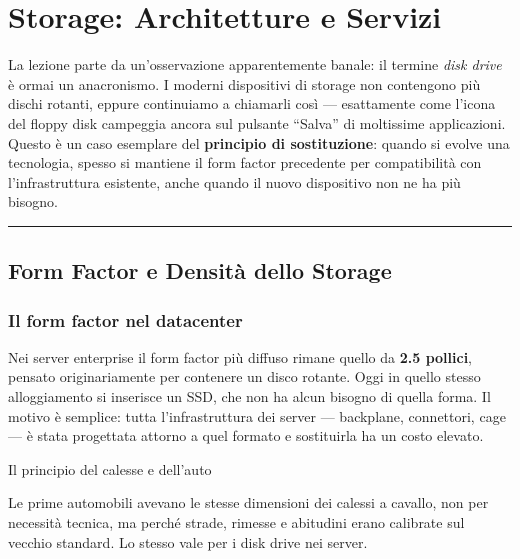 \documentclass[
  italian,
  openany]{book}
\begin{document}
\newpage

\chapter{Storage: Architetture e
Servizi}\label{storage-architetture-e-servizi}

La lezione parte da un'osservazione apparentemente banale: il termine
\emph{disk drive} è ormai un anacronismo. I moderni dispositivi di
storage non contengono più dischi rotanti, eppure continuiamo a
chiamarli così --- esattamente come l'icona del floppy disk campeggia
ancora sul pulsante ``Salva'' di moltissime applicazioni. Questo è un
caso esemplare del \textbf{principio di sostituzione}: quando si evolve
una tecnologia, spesso si mantiene il form factor precedente per
compatibilità con l'infrastruttura esistente, anche quando il nuovo
dispositivo non ne ha più bisogno.

\begin{center}\rule{0.5\linewidth}{0.5pt}\end{center}

\section{Form Factor e Densità dello
Storage}\label{form-factor-e-densituxe0-dello-storage}

\subsection{Il form factor nel
datacenter}\label{il-form-factor-nel-datacenter}

Nei server enterprise il form factor più diffuso rimane quello da
\textbf{2.5 pollici}, pensato originariamente per contenere un disco
rotante. Oggi in quello stesso alloggiamento si inserisce un SSD, che
non ha alcun bisogno di quella forma. Il motivo è semplice: tutta
l'infrastruttura dei server --- backplane, connettori, cage --- è stata
progettata attorno a quel formato e sostituirla ha un costo elevato.

\begin{callouttip}{Il principio del calesse e dell’auto}

Le prime automobili avevano le stesse dimensioni dei calessi a cavallo,
non per necessità tecnica, ma perché strade, rimesse e abitudini erano
calibrate sul vecchio standard. Lo stesso vale per i disk drive nei
server.

\end{callouttip}
\end{document}
